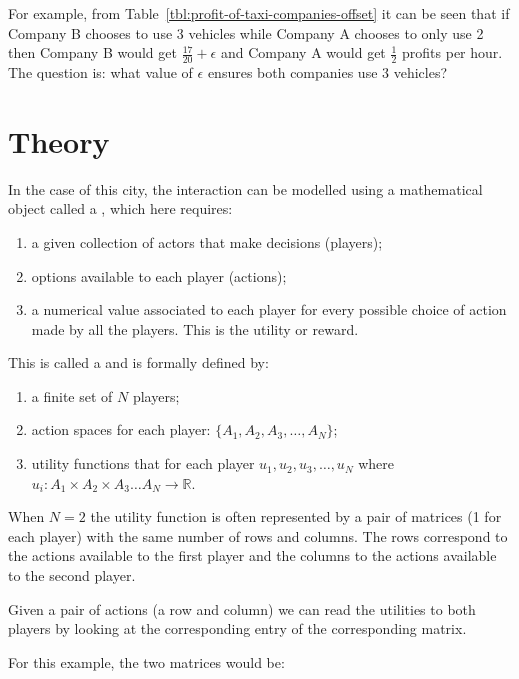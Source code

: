 For example, from Table~\ref{tbl:profit-of-taxi-companies-offset} it can be seen that if Company B
chooses to use 3 vehicles while Company A chooses to only use 2 then Company B
would get \(\frac{17}{20} + \epsilon\) and Company A would get \(\frac{1}{2}\)
profits per hour. The question is: what value of \(\epsilon\) ensures both
companies use 3 vehicles?

\section{Theory}\label{sec:game_theory_theory}

In the case of this city, the interaction can be modelled using a mathematical
object called a , which here requires:

\begin{enumerate}
    \item a given collection of actors that make decisions (players);
    \item options available to each player (actions);
    \item a numerical value associated to each player for every possible
        choice of action made by all the players. This is the utility or reward.
\end{enumerate}

This is called a  and is formally defined by:

\begin{enumerate}
    \item a finite set of \(N\) players;
    \item action spaces for each player: \(\{A_1, A_2, A_3, \dots, A_N\}\);
    \item utility functions that for each player \(u_1, u_2, u_3, \dots, u_N\)
        where \(u_i:A_1\times A_2 \times A_3 \dots A_N \to \mathbb{R}\).
\end{enumerate}

When \(N=2\) the utility function is often represented by a pair of
matrices (1
for each player) with the same number of rows and columns. The rows
correspond to the actions available to the first player and the columns to the
actions available to the second player.

Given a pair of actions (a row and column) we can read the utilities to both
players by looking at the corresponding entry of the corresponding matrix.

For this example, the two matrices would be:

